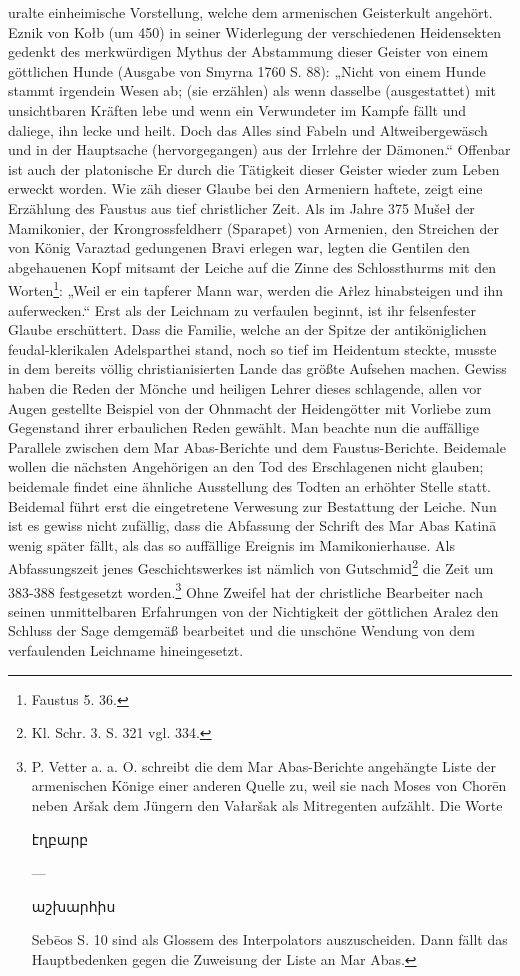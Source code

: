 \documentclass{article}
\begin{document}
uralte einheimische Vorstellung, welche dem armenischen Geisterkult angehört. Eznik von Kołb (um 450) in seiner Widerlegung der verschiedenen Heidensekten gedenkt des merkwürdigen Mythus der Abstammung dieser Geister von einem göttlichen Hunde (Ausgabe von Smyrna 1760 S. 88): „Nicht von einem Hunde stammt irgendein Wesen ab; (sie erzählen) als wenn dasselbe (ausgestattet) mit unsichtbaren Kräften lebe und wenn ein Verwundeter im Kampfe fällt und daliege, ihn lecke und heilt. Doch das Alles sind Fabeln und Altweibergewäsch und in der Hauptsache (hervorgegangen) aus der Irrlehre der Dämonen.“ Offenbar ist auch der platonische Er durch die Tätigkeit dieser Geister wieder zum Leben erweckt worden. Wie zäh dieser Glaube bei den Armeniern haftete, zeigt eine Erzählung des Faustus aus tief christlicher Zeit. Als im Jahre 375 Mušeł der Mamikonier, der Krongrossfeldherr (Sparapet) von Armenien, den Streichen der von König Varaztad gedungenen Bravi erlegen war, legten die Gentilen den abgehauenen Kopf mitsamt der Leiche auf die Zinne des Schlossthurms mit den Worten\footnote{Faustus 5. 36.}: „Weil er ein tapferer Mann war, werden die Aṙlez hinabsteigen und ihn auferwecken.“ Erst als der Leichnam zu verfaulen beginnt, ist ihr felsenfester Glaube erschüttert. Dass die Familie, welche an der Spitze der antiköniglichen feudal-klerikalen Adelsparthei stand, noch so tief im Heidentum steckte, musste in dem bereits völlig christianisierten Lande das größte Aufsehen machen. Gewiss haben die Reden der Mönche und heiligen Lehrer dieses schlagende, allen vor Augen gestellte Beispiel von der Ohnmacht der Heidengötter mit Vorliebe zum Gegenstand ihrer erbaulichen Reden gewählt. Man beachte nun die auffällige Parallele zwischen dem Mar Abas-Berichte und dem Faustus-Berichte. Beidemale wollen die nächsten Angehörigen an den Tod des Erschlagenen nicht glauben; beidemale findet eine ähnliche Ausstellung des Todten an erhöhter Stelle statt. Beidemal führt erst die eingetretene Verwesung zur Bestattung der Leiche. Nun ist es gewiss nicht zufällig, dass die Abfassung der Schrift des Mar Abas Katinā wenig später fällt, als das so auffällige Ereignis im Mamikonierhause. Als Abfassungszeit jenes Geschichtswerkes ist nämlich von Gutschmid\footnote{Kl. Schr. 3. S. 321 vgl. 334.} die Zeit um 383-388 festgesetzt worden.\footnote{P. Vetter a. a. O. schreibt die dem Mar Abas-Berichte angehängte Liste der armenischen Könige einer anderen Quelle zu, weil sie nach Moses von Chorēn neben Aršak dem Jüngern den Vałaršak als Mitregenten aufzählt. Die Worte \begin{armenian}էղբարբ\end{armenian} — \begin{armenian}աշխարհիս\end{armenian} Sebēos S. 10 sind als Glossem des Interpolators auszuscheiden. Dann fällt das Hauptbedenken gegen die Zuweisung der Liste an Mar Abas.} Ohne Zweifel hat der christliche Bearbeiter nach seinen unmittelbaren Erfahrungen von der Nichtigkeit der göttlichen Aralez den Schluss der Sage demgemäß bearbeitet und die unschöne Wendung von dem verfaulenden Leichname hineingesetzt.
\end{document}
